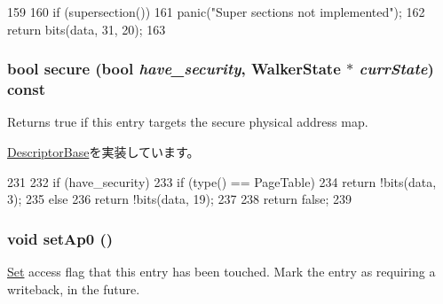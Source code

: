 \begin{DoxyCode}
159         {
160             if (supersection())
161                 panic("Super sections not implemented\n");
162             return bits(data, 31, 20);
163         }
\end{DoxyCode}
\hypertarget{classArmISA_1_1TableWalker_1_1L1Descriptor_a183500f0404847b8d9ea66ef3cba6ca5}{
\subsubsection[{secure}]{\setlength{\rightskip}{0pt plus 5cm}bool secure (bool {\em have\_\-security}, \/  {\bf WalkerState} $\ast$ {\em currState}) const}}
\label{classArmISA_1_1TableWalker_1_1L1Descriptor_a183500f0404847b8d9ea66ef3cba6ca5}
Returns true if this entry targets the secure physical address map. 

\hyperlink{classArmISA_1_1TableWalker_1_1DescriptorBase_ab436e8aede9276b99fb2e8eac6d784a3}{DescriptorBase}を実装しています。


\begin{DoxyCode}
231         {
232             if (have_security) {
233                 if (type() == PageTable)
234                     return !bits(data, 3);
235                 else
236                     return !bits(data, 19);
237             }
238             return false;
239         }
\end{DoxyCode}
\hypertarget{classArmISA_1_1TableWalker_1_1L1Descriptor_ae309fe90579f95e8236119ad4e4b89c6}{
\subsubsection[{setAp0}]{\setlength{\rightskip}{0pt plus 5cm}void setAp0 ()}}
\label{classArmISA_1_1TableWalker_1_1L1Descriptor_ae309fe90579f95e8236119ad4e4b89c6}
\hyperlink{classSet}{Set} access flag that this entry has been touched. Mark the entry as requiring a writeback, in the future. 


